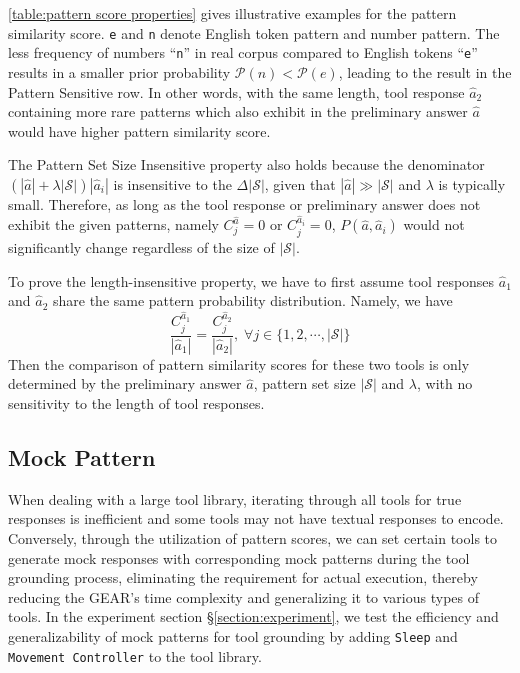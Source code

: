\documentclass[11pt]{article}
\newcommand{\name}{{\fontfamily{cmss}\selectfont GEAR}}
\newcommand{\sleep}{{\tt Sleep}}
\newcommand{\map}{{\tt Movement Controller}}
\begin{document}
\autoref{table:pattern score properties} gives illustrative examples for the pattern similarity score. \texttt{e} and \texttt{n} denote English token pattern and number pattern. The less frequency of numbers ``\texttt{n}'' in real corpus compared to English tokens ``\texttt{e}'' results in a smaller prior probability $\mathcal{P}(n) < \mathcal{P}(e)$, leading to the result in the Pattern Sensitive row. In other words, with the same length, tool response $\hat{a}_2$ containing more rare patterns which also exhibit in the preliminary answer $\hat{a}$ would have higher pattern similarity score. 

The Pattern Set Size Insensitive property also holds because the denominator $(|\hat{a}| + \lambda|\mathcal{S}|)|\hat{a}_i|$ is insensitive to the $\Delta |\mathcal{S}|$, given that $|\hat{a}| \gg |\mathcal{S}|$ and $\lambda$ is typically small. Therefore, as long as the tool response or preliminary answer does not exhibit the given patterns, namely $C^{\hat{a}}_j = 0$ or $C^{\hat{a}_i}_j = 0$, $P(\hat{a}, \hat{a}_i)$ would not significantly change regardless of the size of $|\mathcal{S}|$.

To prove the length-insensitive property, we have to first assume tool responses $\hat{a}_1$ and $\hat{a}_2$ share the same pattern probability distribution. Namely, we have
$$
\frac{C^{\hat{a}_1}_j}{|\hat{a}_1|} = \frac{C^{\hat{a}_2}_j}{|\hat{a}_2|},\; \forall j \in \{1,2,\cdots,|\mathcal{S}|\}
$$
Then the comparison of pattern similarity scores for these two tools is only determined by the preliminary answer $\hat{a}$, pattern set size $|\mathcal{S}|$ and $\lambda$, with no sensitivity to the length of tool responses.

\subsection{Mock Pattern}
\label{Appendix: Mock pattern}
When dealing with a large tool library, iterating through all tools for true responses is inefficient and some tools may not have textual responses to encode. Conversely, through the utilization of pattern scores, we can set certain tools to generate mock responses with corresponding mock patterns during the tool grounding process, eliminating the requirement for actual execution, thereby reducing the \name's time complexity and generalizing it to various types of tools. In the experiment section \S\ref{section:experiment}, we test the efficiency and generalizability of mock patterns for tool grounding by adding \sleep{} and \map{} to the tool library.
\end{document}
